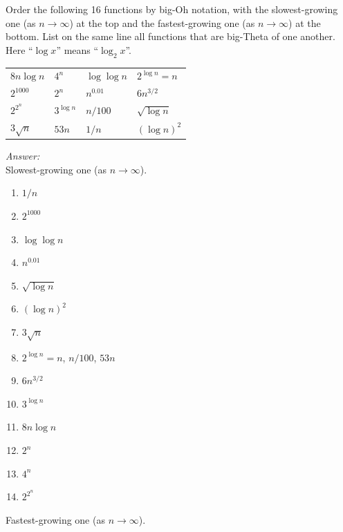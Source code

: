 \documentclass[a4paper]{article}
\newcommand{\ans}{\textit{Answer: }}
\newenvironment{question}[2][Question]{\begin{trivlist}
\item[\hskip \labelsep {\bfseries #1}\hskip \labelsep {\bfseries #2.}]}{\end{trivlist}}
\begin{document}
\begin{question}{16}
Order the following 16 functions by big-Oh notation, with the slowest-growing one (as $n →
∞$) at the top and the fastest-growing one (as $n → ∞$) at the bottom. List on the same line
all functions that are big-Theta of one another. Here “$\log x$” means “$\log_2 x$”.

\begin{center}
  \begin{tabular}{llll}
  $8n \log n$  & $4^n$        & $\log \log n$ & $2^{\log n} = n$   \\
  $2^{1000}$   & $2^n$        & $n^{0.01}$    & $6n^{3/2}$     \\
  $2^{2^n}$    & $3^{\log n}$ & $n/100$       & $\sqrt{\log n}$\\
  $3 \sqrt{n}$ & $53n$        & $1/n$         & $(\log n)^2$      
  \end{tabular}
\end{center}

\ans \\
Slowest-growing one (as $n → ∞$).
\begin{enumerate}
  \item $1/n$
  \item $2^{1000}$
  \item $\log \log n$
  \item $n^{0.01}$
  \item $\sqrt{\log n}$
  \item $(\log n)^2$
  \item $3 \sqrt{n}$
  \item $2^{\log n} = n$, $n/100$, $53n$
  \item $6n^{3/2}$
  \item $3^{\log n}$
  \item $8n \log n$
  \item $2^n$
  \item $4^n$
  \item $2^{2^n}$
\end{enumerate}
Fastest-growing one (as $n → ∞$).

\end{question}
\end{document}
